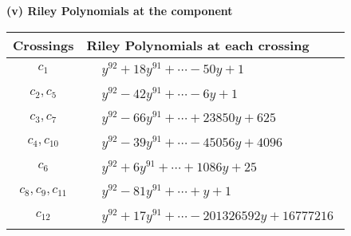 \documentclass[1p]{elsarticle_modified}
\theoremstyle{definition}
\begin{document}
\flushleft \textbf{(v) Riley Polynomials at the component}\newline \\
\begin{tabular}{m{50pt}|m{274pt}}
Crossings & \hspace{64pt}Riley Polynomials at each crossing \\
\hline $$\begin{aligned}c_{1}\end{aligned}$$&$\begin{aligned}
&y^{92}+18 y^{91}+\cdots-50 y+1
\end{aligned}$\\
\hline $$\begin{aligned}c_{2},c_{5}\end{aligned}$$&$\begin{aligned}
&y^{92}-42 y^{91}+\cdots-6 y+1
\end{aligned}$\\
\hline $$\begin{aligned}c_{3},c_{7}\end{aligned}$$&$\begin{aligned}
&y^{92}-66 y^{91}+\cdots+23850 y+625
\end{aligned}$\\
\hline $$\begin{aligned}c_{4},c_{10}\end{aligned}$$&$\begin{aligned}
&y^{92}-39 y^{91}+\cdots-45056 y+4096
\end{aligned}$\\
\hline $$\begin{aligned}c_{6}\end{aligned}$$&$\begin{aligned}
&y^{92}+6 y^{91}+\cdots+1086 y+25
\end{aligned}$\\
\hline $$\begin{aligned}c_{8},c_{9},c_{11}\end{aligned}$$&$\begin{aligned}
&y^{92}-81 y^{91}+\cdots+y+1
\end{aligned}$\\
\hline $$\begin{aligned}c_{12}\end{aligned}$$&$\begin{aligned}
&y^{92}+17 y^{91}+\cdots-201326592 y+16777216
\end{aligned}$\\
\hline
\end{tabular}\\~\\
\end{document}
